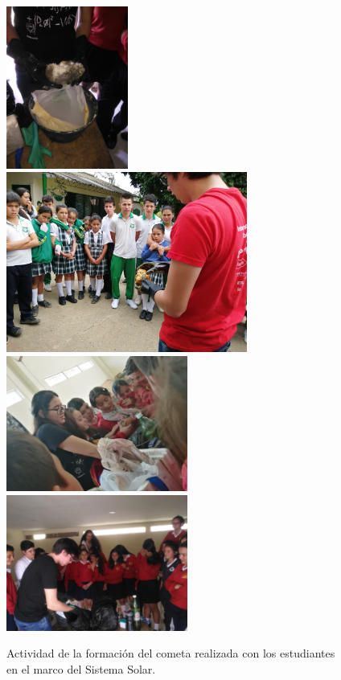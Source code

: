 \documentclass[a4paper,10pt]{article}
\begin{document}
\begin{figure}[H]
    \centering
    \includegraphics[width=4cm]{clavellinas/cometa11.jpeg}
    \includegraphics[width=7.9cm]{clavellinas/cometa2-portico.jpeg}
    \includegraphics[width=5.95cm]{clavellinas/cometa-sanluis.jpeg}
    \includegraphics[width=5.95cm]{clavellinas/cometa-sanluiss.jpeg}
    \caption{Actividad de la formación del cometa realizada con los estudiantes en el marco del Sistema Solar.}
    \label{fig:my_label}
\end{figure}
\end{document}
